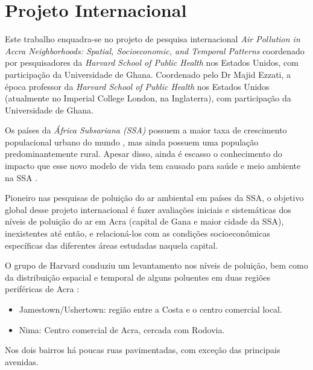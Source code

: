 \section{Projeto Internacional}

Este trabalho enquadra-se no projeto de pesquisa internacional 
\textit{Air Pollution in Accra Neighborhoods: Spatial, Socioeconomic, and Temporal Patterns} 
coordenado por pesquisadores da \textit{Harvard School of Public Health} nos Estados Unidos, 
com participação da Universidade de Ghana. 
Coordenado pelo Dr Majid Ezzati, a época professor da \textit{Harvard School of Public Health} 
nos Estados Unidos (atualmente no Imperial College London, na Inglaterra), com participação 
da Universidade de Ghana. 

Os países da \textit{África Subsariana (SSA)} possuem a maior taxa de crescimento 
populacional urbano do mundo \cite{united2006world}, mas ainda possuem uma população 
predominantemente rural. 
Apesar disso, ainda é escasso o conhecimento do impacto que esse novo modelo de vida 
tem causado para saúde e meio ambiente na SSA \cite{cohen2004urban}. 

Pioneiro nas pesquisas de poluição do ar ambiental em países da SSA, o objetivo 
global desse projeto internacional é fazer avaliações iniciais e sistemáticas 
dos níveis de poluição do ar em Acra (capital de Gana e maior cidade da SSA), 
inexistentes até então, e relacioná-los com as condições socioeconômicas 
específicas das diferentes áreas estudadas naquela capital.

O grupo de Harvard \citep{ARKU2008} conduziu um levantamento nos níveis de 
poluição, bem como da distribuição espacial e temporal de alguns poluentes 
em duas regiões periféricas de Acra \citep{DIONISIO2010}:



\begin{itemize}
  \item Jamestown/Ushertown: região entre a Costa e o centro comercial local.
  \item Nima: Centro comercial de Acra, cercada com Rodovia.
\end{itemize} 

Nos dois bairros há poucas ruas pavimentadas, com exceção das principais 
avenidas.
